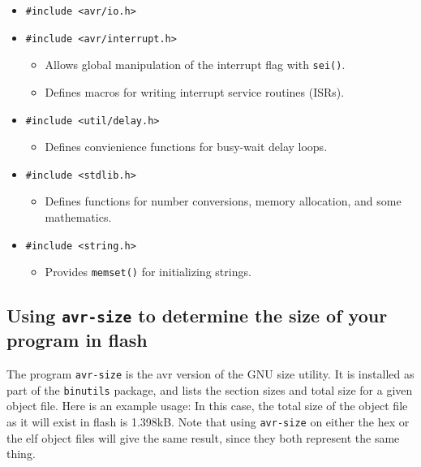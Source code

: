 \begin{itemize}
    \item \texttt{\#include <avr/io.h>}
    \item \texttt{\#include <avr/interrupt.h>}
        \begin{itemize}
            \item Allows global manipulation of the interrupt flag with \texttt{sei()}.
            \item Defines macros for writing interrupt service routines (ISRs).
        \end{itemize}
    \item \texttt{\#include <util/delay.h>}
        \begin{itemize}
            \item Defines convienience functions for busy-wait delay loops.
        \end{itemize}
    \item \texttt{\#include <stdlib.h>}
        \begin{itemize}
            \item Defines functions for number conversions, memory allocation, and some mathematics.
        \end{itemize}
    \item \texttt{\#include <string.h>}
        \begin{itemize}
            \item Provides \texttt{memset()} for initializing strings.
        \end{itemize}
\end{itemize}



\subsection[Using \texttt{avr-size}]{Using \texttt{avr-size} to determine the size of your program in flash}

The program \texttt{avr-size} is the avr version of the GNU size utility.  It is installed as part of the \texttt{binutils} package, and lists the section sizes and total size for a given object file.  Here is an example usage:
In this case, the total size of the object file as it will exist in flash is 1.398kB.  Note that using \texttt{avr-size} on either the hex or the elf object files will give the same result, since they both represent the same thing.
